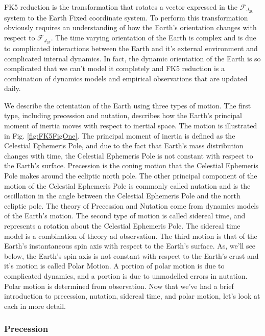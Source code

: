 FK5 reduction is the transformation that rotates a vector
expressed in the $\mathcal{F}_{J_{2k}}$ system to the Earth Fixed
coordinate system. To perform this transformation obviously
requires an understanding of how the Earth's orientation changes
with respect to $\mathcal{F}_{J_{2k}}$.  The time varying
orientation of the Earth is complex and is due to complicated
interactions between the Earth and it's external environment and
complicated internal dynamics. In fact, the dynamic orientation of
the Earth is so complicated that we can't model it completely and
FK5 reduction is a combination of dynamics models and empirical
observations that are updated daily.

We describe the orientation of the Earth using three types of
motion.  The first type, including precession and nutation,
describes how the Earth's principal moment of inertia moves with
respect to inertial space\cite{seidelmann}.  The motion is
illustrated in Fig. \ref{fig:FK5FigOne}. The principal moment of
inertia is defined as the Celestial Ephemeris Pole, and due to the fact that Earth's mass distribution
changes with time, the Celestial Ephemeris Pole is not constant with
respect to the Earth's surface. Precession is the coning motion that
the Celestial Ephemeris Pole makes around the ecliptic north pole.
The other principal component of the motion of the Celestial
Ephemeris Pole is commonly called nutation and is the oscillation in
the angle between the Celestial Ephemeris Pole and the north
ecliptic pole. The theory of Precession and Nutation come from
dynamics models of the Earth's motion.  The second type of motion is
called sidereal time, and represents a rotation about the Celestial
Ephemeris Pole. The sidereal time model is a combination of theory
ad observation. The third motion is that of the Earth's
instantaneous spin axis with respect to the Earth's surface.  As,
we'll see below, the Earth's spin axis is not constant with respect
to the Earth's crust and it's motion is called Polar Motion.  A
portion of polar motion is due to complicated dynamics, and a
portion is due to unmodelled errors in nutation. Polar motion is
determined from observation. Now that we've had a brief introduction
to precession, nutation, sidereal time, and polar motion, let's look
at each in more detail.

\subsubsection{Precession}

